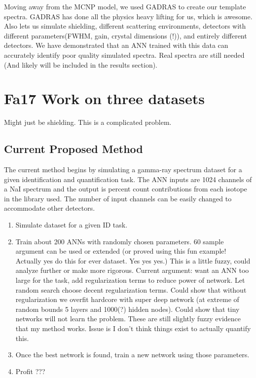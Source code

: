 \documentclass[thesis,tocnosub,noragright,centerchapter,12pt,fullpage]{uiucecethesis09}
\begin{document}
Moving away from the MCNP model, we used GADRAS to create our template spectra. GADRAS has done all the physics heavy lifting for us, which is awesome. Also lets us simulate shielding, different scattering environments, detectors with different parameters(FWHM, gain, crystal dimensions (!)), and entirely different detectors. We have demonstrated that an ANN trained with this data can accurately identify poor quality simulated spectra. Real spectra are still needed (And likely will be included in the results section).

\section{Fa17 Work on three datasets}

Might just be shielding. This is a complicated problem. 

\subsection{Current Proposed Method}


The current method begins by simulating a gamma-ray spectrum dataset for a given identification and quantification task. The ANN inputs are 1024 channels of a NaI spectrum and the output is percent count contributions from each isotope in the library used. The number of input channels can be easily changed to accommodate other detectors. 

\begin{enumerate}
    \item Simulate dataset for a given ID task. 
  
    \item Train about 200 ANNs with randomly chosen parameters. 60 sample argument can be used or extended (or proved using this fun example! Actually yes do this for ever dataset. Yes yes yes.)
    \subitem This is a little fuzzy, could analyze further or make more rigorous.
    \subitem Current argument: want an ANN too large for the task, add regularization terms to reduce power of network. Let random search choose decent regularization terms. 
    \subsubitem Could show that without regularization we overfit hardcore with super deep network (at extreme of random bounds 5 layers and 1000(?) hidden nodes). 
    \subsubitem Could show that tiny networks will not learn the problem.
    \subsubitem These are still slightly fuzzy evidence that my method works. Issue is I don't think things exist to actually quantify this.

    \item Once the best network is found, train a new network using those parameters.
    
    \item Profit ???









\end{enumerate}
\end{document}
